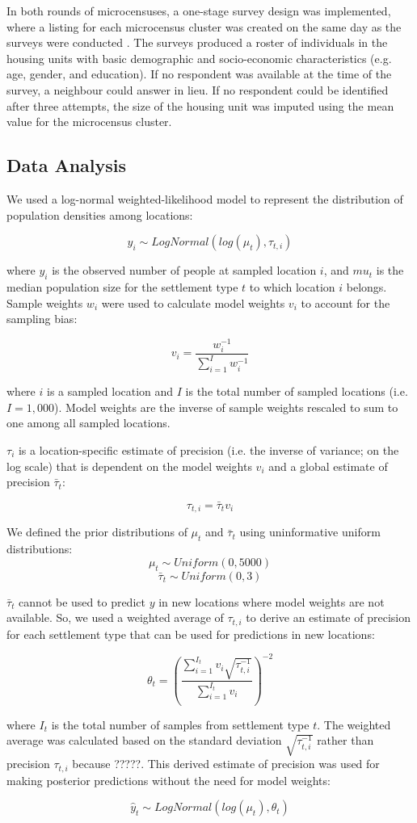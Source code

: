 \documentclass[9pt,twocolumn,twoside,lineno]{pnas-new}
\begin{document}
{	In both rounds of microcensuses, a one-stage survey design was implemented, where a listing for each microcensus cluster was created on the same day as the surveys were conducted \cite{}. The surveys produced a roster of individuals in the housing units with basic demographic and socio-economic characteristics (e.g. age, gender, and education). If no respondent was available at the time of the survey, a neighbour could answer in lieu. If no respondent could be identified after three attempts, the size of the housing unit was imputed using the mean value for the microcensus cluster. 
	
	\subsection{Data Analysis}
	
	We used a log-normal weighted-likelihood model to represent the distribution of population densities among locations:
	
	\[ y_i \sim LogNormal( log( \mu_t ), \tau_{t,i} ) \]
	
	\noindent where $y_i$ is the observed number of people at sampled location $i$, and $mu_t$ is the median population size for the settlement type $t$ to which location $i$ belongs. Sample weights $w_i$ were used to calculate model weights $v_i$ to account for the sampling bias:
	
	\[ v_i = \frac{ w_i^{-1} } { \sum_{i=1}^{I} w_i^{-1} }  \]
	
	\noindent where $i$ is a sampled location and $I$ is the total number of sampled locations (i.e. $I = 1,000$).  Model weights are the inverse of sample weights rescaled to sum to one among all sampled locations.
	
	$\tau_i$ is a location-specific estimate of precision (i.e. the inverse of variance; on the log scale) that is dependent on the model weights $v_i$ and a global estimate of precision $\bar{\tau}_t$:
	
	\[ \tau_{t,i} = \bar{\tau}_t v_i \]
	
	We defined the prior distributions of $\mu_t$ and $\bar{\tau}_t$ using uninformative uniform distributions:
	 \[ \mu_t \sim Uniform(0, 5000) \]
	 \[ \bar{\tau}_t \sim Uniform(0, 3) \]
	
	$\bar{\tau}_t$ cannot be used to predict $y$ in new locations where model weights are not available.  So, we used a weighted average of $\tau_{t,i}$ to derive an estimate of precision for each settlement type that can be used for predictions in new locations:
	
	\[ \theta_t = (\frac{\sum_{i=1}^{I_t} v_i \sqrt{\tau_{t,i}^{-1}} }{\sum_{i=1}^{I_t} v_i})^{-2}   \]
	
	\noindent where $I_t$ is the total number of samples from settlement type $t$. The weighted average was calculated based on the standard deviation $\sqrt{\tau_{t,i}^{-1}}$ rather than precision $\tau_{t,i}$ because ?????. This derived estimate of precision was used for making posterior predictions without the need for model weights:
	
	\[ \hat{y}_t \sim LogNormal( log( \mu_t ), \theta_t) \]


	
}
\end{document}
